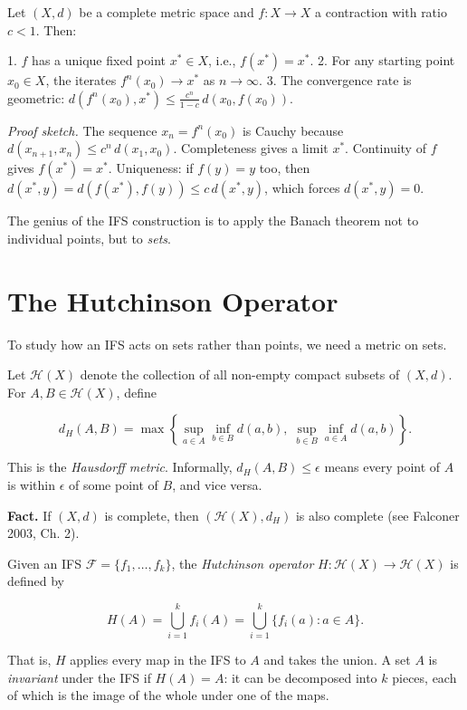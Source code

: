 \begin{theorem}
Let $(X, d)$ be a complete metric space and $f : X \to X$ a contraction with ratio $c < 1$. Then:

1. $f$ has a unique fixed point $x^* \in X$, i.e., $f(x^*) = x^*$.
2. For any starting point $x_0 \in X$, the iterates $f^n(x_0) \to x^*$ as $n \to \infty$.
3. The convergence rate is geometric: $d(f^n(x_0), x^*) \le \frac{c^n}{1 - c} \, d(x_0, f(x_0))$.

\textit{Proof sketch.} The sequence $x_n = f^n(x_0)$ is Cauchy because $d(x_{n+1}, x_n) \le c^n \, d(x_1, x_0)$. Completeness gives a limit $x^*$. Continuity of $f$ gives $f(x^*) = x^*$. Uniqueness: if $f(y) = y$ too, then $d(x^*, y) = d(f(x^*), f(y)) \le c \, d(x^*, y)$, which forces $d(x^*, y) = 0$. 

The genius of the IFS construction is to apply the Banach theorem not to individual points, but to \textit{sets}.

\end{theorem}


\section{The Hutchinson Operator}

To study how an IFS acts on sets rather than points, we need a metric on sets.

\begin{definition}
Let $\mathcal{H}(X)$ denote the collection of all non-empty compact subsets of $(X, d)$. For $A, B \in \mathcal{H}(X)$, define

\[d_H(A, B) = \max\left\{ \sup_{a \in A} \inf_{b \in B} d(a, b),\; \sup_{b \in B} \inf_{a \in A} d(a, b)\right\} .\]

This is the \textit{Hausdorff metric}. Informally, $d_H(A, B) \le \epsilon$ means every point of $A$ is within $\epsilon$ of some point of $B$, and vice versa.

\textbf{Fact.} If $(X, d)$ is complete, then $(\mathcal{H}(X), d_H)$ is also complete (see Falconer 2003, Ch. 2).
\end{definition}

\begin{definition}
Given an IFS $\mathcal{F} = \{ f_1, \ldots, f_k\} $, the \textit{Hutchinson operator} $H : \mathcal{H}(X) \to \mathcal{H}(X)$ is defined by

\[H(A) = \bigcup_{i=1}^{k} f_i(A) = \bigcup_{i=1}^{k} \{ f_i(a) : a \in A\} .\]

That is, $H$ applies every map in the IFS to $A$ and takes the union. A set $A$ is \textit{invariant} under the IFS if $H(A) = A$: it can be decomposed into $k$ pieces, each of which is the image of the whole under one of the maps.
\end{definition}

